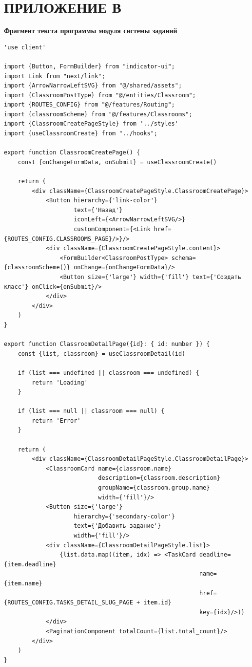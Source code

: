   \section*{ПРИЛОЖЕНИЕ В}
\endgroup
{}
\begin{center}
\textbf{Фрагмент текста программы модуля системы заданий}
\end{center}

\begin{lstlisting}
'use client'

import {Button, FormBuilder} from "indicator-ui";
import Link from "next/link";
import {ArrowNarrowLeftSVG} from "@/shared/assets";
import {ClassroomPostType} from "@/entities/Classroom";
import {ROUTES_CONFIG} from "@/features/Routing";
import {classroomScheme} from "@/features/Classrooms";
import {ClassroomCreatePageStyle} from '../styles'
import {useClassroomCreate} from "../hooks";

export function ClassroomCreatePage() {
    const {onChangeFormData, onSubmit} = useClassroomCreate()

    return (
        <div className={ClassroomCreatePageStyle.ClassroomCreatePage}>
            <Button hierarchy={'link-color'}
                    text={'Назад'}
                    iconLeft={<ArrowNarrowLeftSVG/>}
                    customComponent={<Link href={ROUTES_CONFIG.CLASSROOMS_PAGE}/>}/>
            <div className={ClassroomCreatePageStyle.content}>
                <FormBuilder<ClassroomPostType> schema={classroomScheme()} onChange={onChangeFormData}/>
                <Button size={'large'} width={'fill'} text={'Создать класс'} onClick={onSubmit}/>
            </div>
        </div>
    )
}

export function ClassroomDetailPage({id}: { id: number }) {
    const {list, classroom} = useClassroomDetail(id)

    if (list === undefined || classroom === undefined) {
        return 'Loading'
    }

    if (list === null || classroom === null) {
        return 'Error'
    }

    return (
        <div className={ClassroomDetailPageStyle.ClassroomDetailPage}>
            <ClassroomCard name={classroom.name}
                           description={classroom.description}
                           groupName={classroom.group.name}
                           width={'fill'}/>
            <Button size={'large'}
                    hierarchy={'secondary-color'}
                    text={'Добавить задание'}
                    width={'fill'}/>
            <div className={ClassroomDetailPageStyle.list}>
                {list.data.map((item, idx) => <TaskCard deadline={item.deadline}
                                                        name={item.name}
                                                        href={ROUTES_CONFIG.TASKS_DETAIL_SLUG_PAGE + item.id}
                                                        key={idx}/>)}
            </div>
            <PaginationComponent totalCount={list.total_count}/>
        </div>
    )
}


\end{lstlisting}
